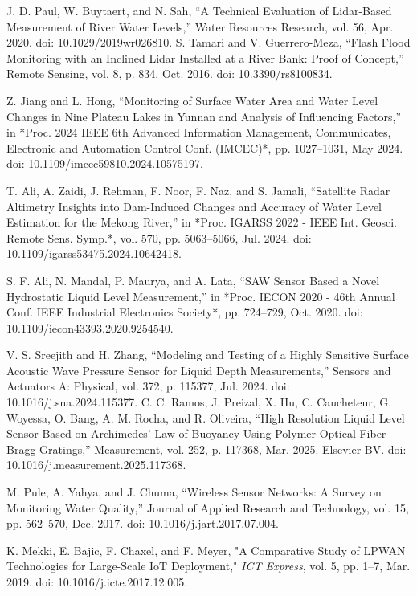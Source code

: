 \documentclass[conference]{IEEEtran}
\begin{document}
\begin{thebibliography}{00}
 J. D. Paul, W. Buytaert, and N. Sah, 
``A Technical Evaluation of Lidar-Based Measurement of River Water Levels,'' 
Water Resources Research, vol. 56, Apr. 2020. doi: 10.1029/2019wr026810.
 S. Tamari and V. Guerrero-Meza, 
``Flash Flood Monitoring with an Inclined Lidar Installed at a River Bank: Proof of Concept,'' 
Remote Sensing, vol. 8, p. 834, Oct. 2016. doi: 10.3390/rs8100834.

 Z. Jiang and L. Hong, 
``Monitoring of Surface Water Area and Water Level Changes in Nine Plateau Lakes in Yunnan and Analysis of Influencing Factors,'' 
in *Proc. 2024 IEEE 6th Advanced Information Management, Communicates, Electronic and Automation Control Conf. (IMCEC)*, 
pp. 1027--1031, May 2024. doi: 10.1109/imcec59810.2024.10575197.

 T. Ali, A. Zaidi, J. Rehman, F. Noor, F. Naz, and S. Jamali, 
``Satellite Radar Altimetry Insights into Dam-Induced Changes and Accuracy of Water Level Estimation for the Mekong River,'' 
in *Proc. IGARSS 2022 - IEEE Int. Geosci. Remote Sens. Symp.*, vol. 570, pp. 5063--5066, Jul. 2024. 
doi: 10.1109/igarss53475.2024.10642418.

 S. F. Ali, N. Mandal, P. Maurya, and A. Lata, 
``SAW Sensor Based a Novel Hydrostatic Liquid Level Measurement,'' 
in *Proc. IECON 2020 - 46th Annual Conf. IEEE Industrial Electronics Society*, pp. 724--729, Oct. 2020. 
doi: 10.1109/iecon43393.2020.9254540.

 V. S. Sreejith and H. Zhang, 
``Modeling and Testing of a Highly Sensitive Surface Acoustic Wave Pressure Sensor for Liquid Depth Measurements,'' 
Sensors and Actuators A: Physical, vol. 372, p. 115377, Jul. 2024. doi: 10.1016/j.sna.2024.115377.
 C. C. Ramos, J. Preizal, X. Hu, C. Caucheteur, G. Woyessa, O. Bang, A. M. Rocha, and R. Oliveira, 
``High Resolution Liquid Level Sensor Based on Archimedes’ Law of Buoyancy Using Polymer Optical Fiber Bragg Gratings,'' 
Measurement, vol. 252, p. 117368, Mar. 2025. Elsevier BV. doi: 10.1016/j.measurement.2025.117368.

 M. Pule, A. Yahya, and J. Chuma, 
``Wireless Sensor Networks: A Survey on Monitoring Water Quality,'' 
Journal of Applied Research and Technology, vol. 15, pp. 562--570, Dec. 2017. doi: 10.1016/j.jart.2017.07.004.

K. Mekki, E. Bajic, F. Chaxel, and F. Meyer, "A Comparative Study of LPWAN Technologies for Large-Scale IoT Deployment," \emph{ICT Express}, vol. 5, pp. 1--7, Mar. 2019. doi: 10.1016/j.icte.2017.12.005.


\end{thebibliography}
\end{document}
